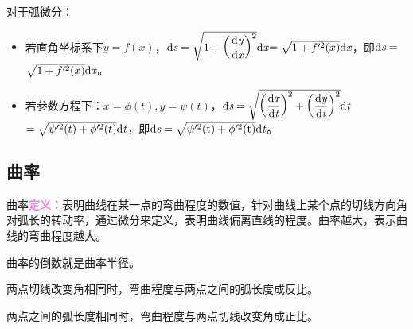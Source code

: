 \documentclass[UTF8, 12pt]{ctexart}
\begin{document}
对于弧微分：

\begin{itemize}
    \item 若直角坐标系下$y=f(x)$，$\rm{d}\textit{s}=\sqrt{1+\left(\dfrac{\rm{d}\textit{y}}{\rm{d}\textit{x}}\right)^2}\rm{d}\textit{x}$$=\sqrt{1+f'^2(x)}\rm{d}\textit{x}$，即$\rm{d}\textit{s}=$$\sqrt{1+f'^2(x)}\rm{d}\textit{x}$。
    \item 若参数方程下：$x=\phi(t),y=\psi(t)$，$\rm{d}\textit{s}=\sqrt{\left(\dfrac{\rm{d}\textit{x}}{\rm{d}\textit{t}}\right)^2+\left(\dfrac{\rm{d}\textit{y}}{\rm{d}\textit{t}}\right)^2}\rm{d}\textit{t}$\medskip\\$=\sqrt{\psi'^2(t)+\phi'^2(t)}\rm{d}\textit{t}$，即$\rm{d}\textit{s}=\sqrt{\psi'^2(t)+\phi'^2(t)}\rm{d}\textit{t}$。
\end{itemize}

\subsection{曲率}

曲率\textcolor{violet}{\textbf{定义：}}表明曲线在某一点的弯曲程度的数值，针对曲线上某个点的切线方向角对弧长的转动率，通过微分来定义，表明曲线偏离直线的程度。曲率越大，表示曲线的弯曲程度越大。

曲率的倒数就是曲率半径。\medskip

\begin{minipage}{0.5\linewidth}
    两点切线改变角相同时，弯曲程度与两点之间的弧长度成反比。

    两点之间的弧长度相同时，弯曲程度与两点切线改变角成正比。
\end{minipage}
\hfill
\begin{minipage}{0.2\linewidth}
\end{minipage}
\hfill
\begin{minipage}{0.2\linewidth}
\end{minipage}
\end{document}
